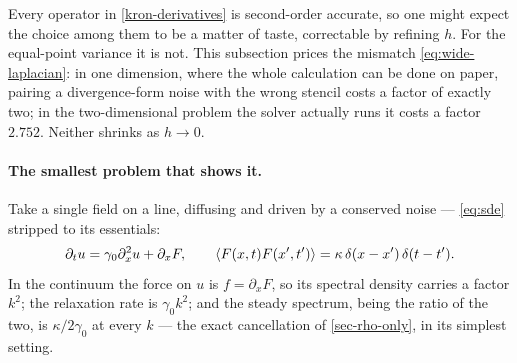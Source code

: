\documentclass[a5paper]{article}
\begin{document}
Every operator in \eqref{kron-derivatives} is second-order accurate, so one might expect the choice among them to be a matter of taste, correctable by refining $h$. For the equal-point variance it is not. This subsection prices the mismatch \eqref{eq:wide-laplacian}: in one dimension, where the whole calculation can be done on paper, pairing a divergence-form noise with the wrong stencil costs a factor of exactly two; in the two-dimensional problem the solver actually runs it costs a factor $2.752$. Neither shrinks as $h\to0$.

\paragraph{The smallest problem that shows it.} Take a single field on a line, diffusing and driven by a conserved noise --- \eqref{eq:sde} stripped to its essentials:
\begin{equation}
    \label{eq:toy-1d}
    \partial_tu = \gamma_0\partial_x^2u + \partial_xF,
    \qquad
    \left\langle F(x,t)F(x',t')\right\rangle = \kappa\,\delta(x-x')\,\delta(t-t').
\end{equation}
In the continuum the force on $u$ is $f = \partial_xF$, so its spectral density carries a factor $k^2$; the relaxation rate is $\gamma_0k^2$; and the steady spectrum, being the ratio of the two, is $\kappa/2\gamma_0$ at every $k$ --- the exact cancellation of \cref{sec-rho-only}, in its simplest setting.
\end{document}
